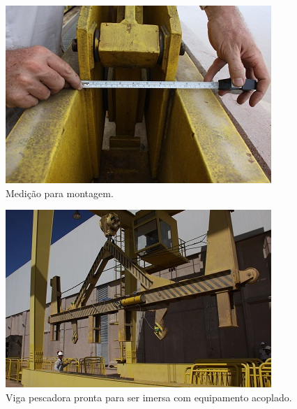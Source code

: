 \begin{figure}[h!]
  \centering
  \includegraphics[width=1\linewidth]{Fotos/Janeiro2015/9.JPG}
  \caption{Medição para montagem.}
  \label{nov20132}
\end{figure}

\begin{figure}[h!]
  \centering
  \includegraphics[width=1\linewidth]{Fotos/Janeiro2015/13.JPG}
  \caption{Viga pescadora pronta para ser imersa com equipamento acoplado.}
  \label{nov20133}
\end{figure}

